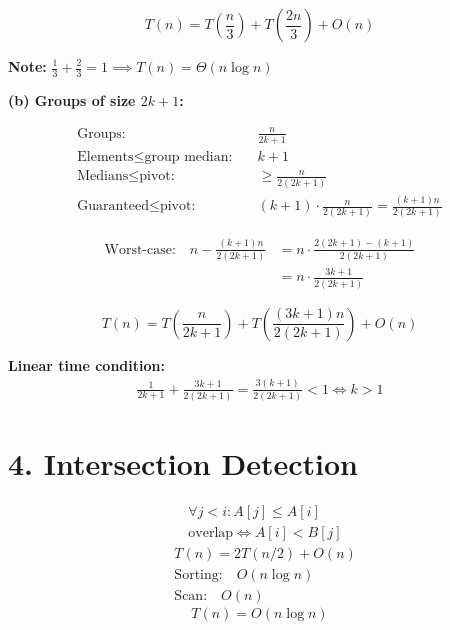 \documentclass[11pt]{article}
\begin{document}
\[
\boxed{T(n) = T\!\left(\frac{n}{3}\right) + T\!\left(\frac{2n}{3}\right) + O(n)}
\]

\textbf{Note:} $\frac{1}{3} + \frac{2}{3} = 1 \implies T(n) = \Theta(n \log n)$

\vspace{1em}
\textbf{(b) Groups of size $2k+1$:}

\begin{align*}
\text{Groups:} \quad & \frac{n}{2k+1} \\
\text{Elements} \le \text{group median:} \quad & k+1 \\
\text{Medians} \le \text{pivot:} \quad & \ge \frac{n}{2(2k+1)} \\
\text{Guaranteed} \le \text{pivot:} \quad & (k+1) \cdot \frac{n}{2(2k+1)} = \frac{(k+1)n}{2(2k+1)}
\end{align*}

\begin{align*}
\text{Worst-case:} \quad n - \frac{(k+1)n}{2(2k+1)} &= n \cdot \frac{2(2k+1) - (k+1)}{2(2k+1)} \\
&= n \cdot \frac{3k+1}{2(2k+1)}
\end{align*}

\[
\boxed{T(n) = T\!\left(\frac{n}{2k+1}\right) + T\!\left(\frac{(3k+1)n}{2(2k+1)}\right) + O(n)}
\]

\textbf{Linear time condition:}
\begin{align*}
\frac{1}{2k+1} + \frac{3k+1}{2(2k+1)} = \frac{3(k+1)}{2(2k+1)} < 1 \iff k > 1
\end{align*}


\section*{4. Intersection Detection}

\noindent
\begin{minipage}[t]{0.50\textwidth}
\vspace{0pt}
\begin{algorithm}[H]
\DontPrintSemicolon
{}
\end{algorithm}
\end{minipage}%
\begin{minipage}[t]{0.50\textwidth}
\vspace{0pt}
\begin{align*}
&\quad \forall j < i: A[j] \le A[i] \\
&\quad \text{overlap} \iff A[i] < B[j] \\[1em]
&T(n) = 2T(n/2) + O(n) \\
&\text{Sorting:} \quad O(n \log n) \\
&\text{Scan:} \quad O(n)
\end{align*}
\[
\boxed{T(n) = O(n \log n)}
\]
\end{minipage}
\end{document}

